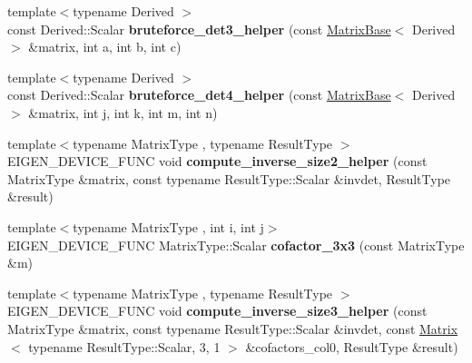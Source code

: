 \begin{DoxyCompactItemize}
{\footnotesize template$<$typename Derived $>$ }\\const Derived\+::\+Scalar {\bfseries bruteforce\+\_\+det3\+\_\+helper} (const \hyperlink{group___core___module_class_eigen_1_1_matrix_base}{Matrix\+Base}$<$ Derived $>$ \&matrix, int a, int b, int c)
\item 
\mbox{\label{namespace_eigen_1_1internal_ac72578f738b594ae28ea7907fcc6c1c2}} 
{\footnotesize template$<$typename Derived $>$ }\\const Derived\+::\+Scalar {\bfseries bruteforce\+\_\+det4\+\_\+helper} (const \hyperlink{group___core___module_class_eigen_1_1_matrix_base}{Matrix\+Base}$<$ Derived $>$ \&matrix, int j, int k, int m, int n)
\item 
\mbox{\label{namespace_eigen_1_1internal_a226353f68c902ad825660b118014f21f}} 
{\footnotesize template$<$typename Matrix\+Type , typename Result\+Type $>$ }\\E\+I\+G\+E\+N\+\_\+\+D\+E\+V\+I\+C\+E\+\_\+\+F\+U\+NC void {\bfseries compute\+\_\+inverse\+\_\+size2\+\_\+helper} (const Matrix\+Type \&matrix, const typename Result\+Type\+::\+Scalar \&invdet, Result\+Type \&result)
\item 
\mbox{\label{namespace_eigen_1_1internal_a9ea59f946316faf22f4e7444f693f465}} 
{\footnotesize template$<$typename Matrix\+Type , int i, int j$>$ }\\E\+I\+G\+E\+N\+\_\+\+D\+E\+V\+I\+C\+E\+\_\+\+F\+U\+NC Matrix\+Type\+::\+Scalar {\bfseries cofactor\+\_\+3x3} (const Matrix\+Type \&m)
\item 
\mbox{\label{namespace_eigen_1_1internal_aa20f632ca9086b4c12fd89ff6c275bff}} 
{\footnotesize template$<$typename Matrix\+Type , typename Result\+Type $>$ }\\E\+I\+G\+E\+N\+\_\+\+D\+E\+V\+I\+C\+E\+\_\+\+F\+U\+NC void {\bfseries compute\+\_\+inverse\+\_\+size3\+\_\+helper} (const Matrix\+Type \&matrix, const typename Result\+Type\+::\+Scalar \&invdet, const \hyperlink{group___core___module_class_eigen_1_1_matrix}{Matrix}$<$ typename Result\+Type\+::\+Scalar, 3, 1 $>$ \&cofactors\+\_\+col0, Result\+Type \&result)
\item 
\mbox{\label{namespace_eigen_1_1internal_a2f9bd6b722b2debe228dc7b07737d6f7}} 

\end{DoxyCompactItemize}
